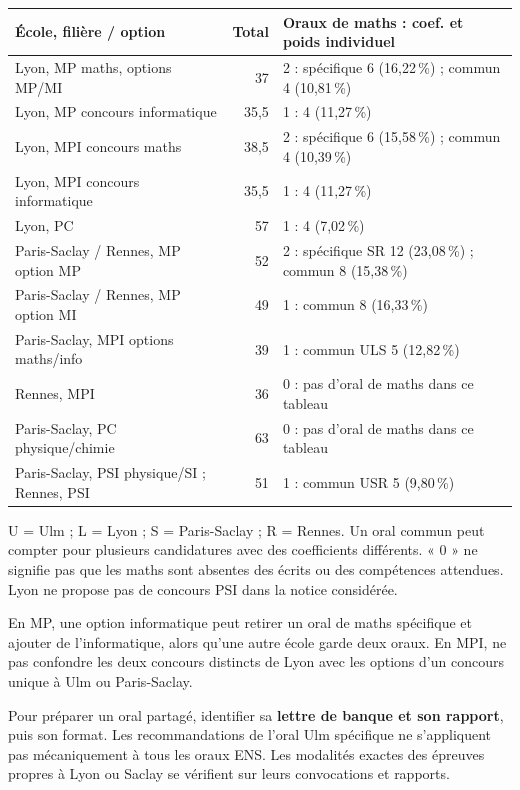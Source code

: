 \documentclass[10pt,a4paper]{article}
\newcommand{\inter}[1]{\par\vspace{3mm}{\sffamily\bfseries\large\color{teal}#1}\par}
\newcommand{\note}[1]{\par{\small\color{muted}#1}\par}
\begin{document}
\begin{tabularx}{\linewidth}{@{}>{\raggedright\arraybackslash}p{46mm}r X@{}}
\textbf{École, filière / option} & \textbf{Total} & \textbf{Oraux de maths : coef. et poids individuel} \\\hline
Lyon, MP maths, options MP/MI & 37 & 2 : spécifique 6 (16,22\,\%) ; commun 4 (10,81\,\%) \\
Lyon, MP concours informatique & 35,5 & 1 : 4 (11,27\,\%) \\
Lyon, MPI concours maths & 38,5 & 2 : spécifique 6 (15,58\,\%) ; commun 4 (10,39\,\%) \\
Lyon, MPI concours informatique & 35,5 & 1 : 4 (11,27\,\%) \\
Lyon, PC & 57 & 1 : 4 (7,02\,\%) \\
Paris-Saclay / Rennes, MP option MP & 52 & 2 : spécifique SR 12 (23,08\,\%) ; commun 8 (15,38\,\%) \\
Paris-Saclay / Rennes, MP option MI & 49 & 1 : commun 8 (16,33\,\%) \\
Paris-Saclay, MPI options maths/info & 39 & 1 : commun ULS 5 (12,82\,\%) \\
Rennes, MPI & 36 & 0 : pas d'oral de maths dans ce tableau \\
Paris-Saclay, PC physique/chimie & 63 & 0 : pas d'oral de maths dans ce tableau \\
Paris-Saclay, PSI physique/SI ; Rennes, PSI & 51 & 1 : commun USR 5 (9,80\,\%) \\
\end{tabularx}
\note{U = Ulm ; L = Lyon ; S = Paris-Saclay ; R = Rennes. Un oral commun peut compter pour plusieurs candidatures avec des coefficients différents. « 0 » ne signifie pas que les maths sont absentes des écrits ou des compétences attendues. Lyon ne propose pas de concours PSI dans la notice considérée.}
\inter{Ce que cela change pour l'entraînement}
En MP, une option informatique peut retirer un oral de maths spécifique et ajouter de l'informatique, alors qu'une autre école garde deux oraux. En MPI, ne pas confondre les deux concours distincts de Lyon avec les options d'un concours unique à Ulm ou Paris-Saclay.\par
Pour préparer un oral partagé, identifier sa \textbf{lettre de banque et son rapport}, puis son format. Les recommandations de l'oral Ulm spécifique ne s'appliquent pas mécaniquement à tous les oraux ENS. Les modalités exactes des épreuves propres à Lyon ou Saclay se vérifient sur leurs convocations et rapports.\par
\end{document}
